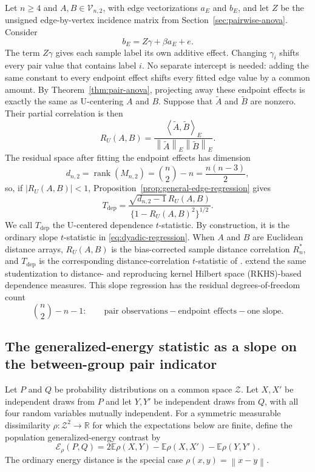 \documentclass[11pt]{article}
\theoremstyle{plain}
\theoremstyle{definition}
\theoremstyle{remark}
\newcommand{\R}{\mathbb R}
\newcommand{\E}{\mathbb E}
\newcommand{\rank}{\operatorname{rank}}
\newcommand{\cV}{\mathcal V}
\newcommand{\inner}[2]{\left\langle #1,#2\right\rangle}
\newcommand{\norm}[1]{\left\lVert #1\right\rVert}
\begin{document}
Let $n\ge4$ and $A,B\in\cV_{n,2}$, with edge vectorizations $a_E$ and
$b_E$, and let $Z$ be the unsigned edge-by-vertex incidence matrix from
Section~\ref{sec:pairwise-anova}.  Consider
\begin{equation}
 b_E=Z\gamma+\beta a_E+e.
 \label{eq:dyadic-regression}
\end{equation}
The term $Z\gamma$ gives each sample label its own additive effect.  Changing
$\gamma_i$ shifts every pair value that contains label $i$.  No separate
intercept is needed: adding the same constant to every endpoint effect shifts
every fitted edge value by a common amount.
By Theorem~\ref{thm:pair-anova}, projecting away these endpoint effects is
exactly the same as U-centering $A$ and $B$.
Suppose that $\widetilde A$ and $\widetilde B$ are nonzero.  Their partial
correlation is then
\begin{equation}
 R_U(A,B)=
 \frac{\inner{\widetilde A}{\widetilde B}_E}
 {\norm{\widetilde A}_E\norm{\widetilde B}_E}.
 \label{eq:u-residual-correlation}
\end{equation}
The residual space after fitting the endpoint effects has dimension
\[
 d_{n,2}=\rank(M_{n,2})=\binom n2-n=\frac{n(n-3)}2,
\]
so, if $|R_U(A,B)|<1$, Proposition~\ref{prop:general-edge-regression} gives
\begin{equation}
 T_{\mathrm{dep}}
 =\frac{\sqrt{d_{n,2}-1}\,R_U(A,B)}
 {\{1-R_U(A,B)^2\}^{1/2}}.
 \label{eq:edge-regression-t}
\end{equation}
We call $T_{\mathrm{dep}}$ the U-centered dependence $t$-statistic.  By
construction, it is the ordinary slope $t$-statistic in
\eqref{eq:dyadic-regression}.  When $A$ and $B$ are Euclidean distance arrays,
$R_U(A,B)$ is the bias-corrected sample distance correlation $R_n^*$, and
$T_{\mathrm{dep}}$ is the corresponding distance-correlation $t$-statistic of
\citet{SzekelyRizzo2013}.
\citet{ZhuZhangYaoShao2020} extend the same studentization to distance- and
reproducing kernel Hilbert space (RKHS)-based dependence measures.  This slope
regression has the residual degrees-of-freedom count
\[
 \binom n2-n-1:
 \qquad
 \text{pair observations}-\text{endpoint effects}-\text{one slope}.
\]

\subsection{The generalized-energy statistic as a slope on the between-group pair indicator}

Let $P$ and $Q$ be probability distributions on a common space $\mathcal Z$.
Let $X,X'$ be independent draws from $P$ and let $Y,Y'$ be independent draws
from $Q$, with all four random variables mutually independent.  For a
symmetric measurable dissimilarity $\rho:\mathcal Z^2\to\R$ for which the
expectations below are finite, define the population generalized-energy
contrast by
\[
 \mathcal E_\rho(P,Q)
 =2\E\rho(X,Y)-\E\rho(X,X')-\E\rho(Y,Y').
\]
The ordinary energy distance is the special case $\rho(x,y)=\norm{x-y}$.
\end{document}
